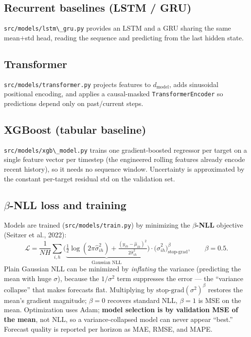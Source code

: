 \documentclass[11pt,a4paper]{article}
\newcommand{\code}[1]{\lstinline[basicstyle=\ttfamily\normalsize]!#1!}
\begin{document}
\subsection{Recurrent baselines (LSTM / GRU)}
\code{src/models/lstm\_gru.py} provides an LSTM and a GRU sharing the same
mean$+$std head, reading the sequence and predicting from the last hidden state.

\subsection{Transformer}
\code{src/models/transformer.py} projects features to $d_{\text{model}}$, adds
sinusoidal positional encoding, and applies a causal-masked
\code{TransformerEncoder} so predictions depend only on past/current steps.

\subsection{XGBoost (tabular baseline)}
\code{src/models/xgb\_model.py} trains one gradient-boosted regressor per target
on a single feature vector per timestep (the engineered rolling features already
encode recent history), so it needs no sequence window. Uncertainty is
approximated by the constant per-target residual std on the validation set.

\subsection{$\beta$-NLL loss and training}
Models are trained (\code{src/models/train.py}) by minimizing the
\textbf{$\beta$-NLL} objective (Seitzer et al., 2022):
\[
\mathcal{L}=\frac{1}{NH}\sum_{i,h}
\Big(\underbrace{\tfrac12\log(2\pi\hat\sigma_{ih}^2)+\tfrac{(y_{ih}-\hat\mu_{ih})^2}{2\hat\sigma_{ih}^2}}_{\text{Gaussian NLL}}\Big)\cdot
\big(\hat\sigma_{ih}^2\big)^{\beta}_{\text{stop-grad}},\qquad \beta=0.5.
\]
Plain Gaussian NLL can be minimized by \emph{inflating} the variance (predicting
the mean with huge $\sigma$), because the $1/\sigma^2$ term suppresses the error
--- the ``variance collapse'' that makes forecasts flat. Multiplying by
$\text{stop-grad}(\sigma^2)^\beta$ restores the mean's gradient magnitude;
$\beta{=}0$ recovers standard NLL, $\beta{=}1$ is MSE on the mean. Optimization
uses Adam; \textbf{model selection is by validation MSE of the mean}, not NLL, so
a variance-collapsed model can never appear ``best.'' Forecast quality is
reported per horizon as MAE, RMSE, and MAPE.
\end{document}
